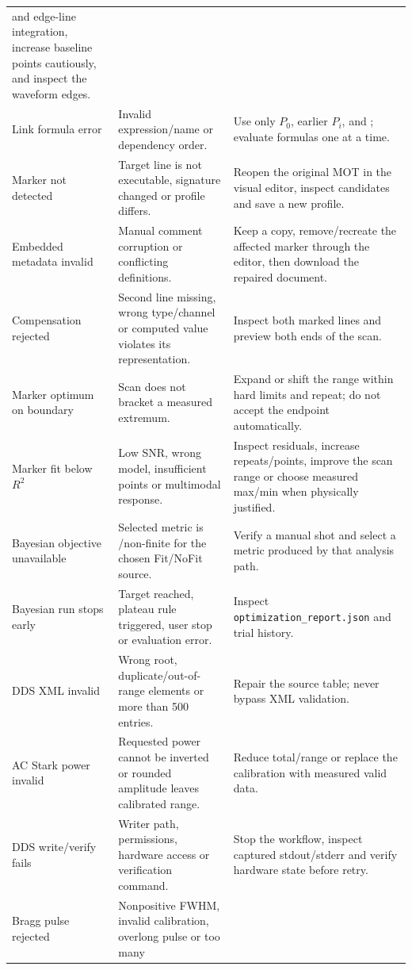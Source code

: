 \documentclass[11pt,oneside,openany]{book}
\newcommand{\code}[1]{\texttt{\detokenize{#1}}}
\newcommand{\pathcode}[1]{\nolinkurl{#1}}
\begin{document}
\begin{longtable}{p{} p{} p{}}
and edge-line integration, increase baseline points cautiously, and inspect the waveform
edges.\\
Link formula error & Invalid expression/name or dependency order. & Use only $P_0$, earlier
$P_i$, \code{math} and \code{np}; evaluate formulas one at a time.\\
Marker not detected & Target line is not executable, signature changed or profile differs.
& Reopen the original MOT in the visual editor, inspect candidates and save a new profile.\\
Embedded metadata invalid & Manual comment corruption or conflicting definitions. & Keep a
copy, remove/recreate the affected marker through the editor, then download the repaired
document.\\
Compensation rejected & Second line missing, wrong type/channel or computed value violates
its representation. & Inspect both marked lines and preview both ends of the scan.\\
Marker optimum on boundary & Scan does not bracket a measured extremum. & Expand or shift
the range within hard limits and repeat; do not accept the endpoint automatically.\\
Marker fit below $R^2$ & Low SNR, wrong model, insufficient points or multimodal response.
& Inspect residuals, increase repeats/points, improve the scan range or choose measured
max/min when physically justified.\\
Bayesian objective unavailable & Selected metric is \code{None}/non-finite for the chosen
Fit/NoFit source. & Verify a manual shot and select a metric produced by that analysis path.\\
Bayesian run stops early & Target reached, plateau rule triggered, user stop or evaluation
error. & Inspect \pathcode{optimization_report.json} \code{stop_reason} and trial history.\\
DDS XML invalid & Wrong root, duplicate/out-of-range elements or more than 500 entries. &
Repair the source table; never bypass XML validation.\\
AC Stark power invalid & Requested power cannot be inverted or rounded amplitude leaves
calibrated range. & Reduce total/range or replace the calibration with measured valid data.\\
DDS write/verify fails & Writer path, permissions, hardware access or verification command.
& Stop the workflow, inspect captured stdout/stderr and verify hardware state before retry.\\
Bragg pulse rejected & Nonpositive FWHM, invalid calibration, overlong pulse or too many

\end{longtable}
\end{document}
